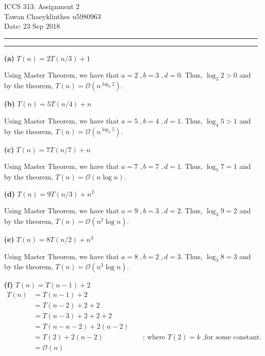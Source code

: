\documentclass[a4paper, 12pt]{article}
\newcommand{\question}[1] {\vspace{.25in} \hrule\vspace{0.5em}
	\noindent{\bf #1} \vspace{0.5em}
	\hrule \vspace{.10in}}
\renewcommand{\part}[1] {\vspace{.10in} {\bf (#1)}}
\begin{document}
	\medskip
	
	\thispagestyle{plain}
	\begin{center}
		{\Large ICCS 313: Assignment 2}\\
		Tawan Chaeyklinthes u5980963\\
		Date: 23 Sep 2018
	\end{center}

\question{Problem 1}

\part{a} $T(n) = 2T(n/3) + 1$

Using Master Theorem, we have that $a = 2\;, b=3\;, d=0$. Thus,
$\log_3 2 > 0$ and by the theorem, $T(n) = \mathcal{O}(n^{\log_3 2})$.

\part{b} $T(n) = 5T(n/4) + n$

Using Master Theorem, we have that $a = 5\;, b=4\;, d=1$. Thus,
$\log_4 5 > 1$ and by the theorem, $T(n) = \mathcal{O}(n^{\log_4 5})$.

\part{c} $T(n) = 7 T(n/7) + n$

Using Master Theorem, we have that $a = 7\;, b=7\;, d=1$. Thus,
$\log_7 7 = 1$ and by the theorem, $T(n) = \mathcal{O}(n\log n)$.

\part{d} $T(n) = 9T(n/3) + n^2 $

Using Master Theorem, we have that $a = 9\;, b=3\;, d=2$. Thus,
$\log_3 9 = 2$ and by the theorem, $T(n) = \mathcal{O}(n^2{\log n})$.

\part{e} $T(n) = 8T(n/2) + n^3$

Using Master Theorem, we have that $a = 8\;, b=2\;, d=3$. Thus,
$\log_3 8 = 3$ and by the theorem, $T(n) = \mathcal{O}(n^3{\log n})$.

\part{f} $T(n) = T(n-1) + 2$
\begin{align*}
	T(n) &= T(n-1) +2\\
	&= T(n-2) +2 +2\\
	&= T(n-3) +2 +2 +2\\
	&= T(n-n-2) + 2(n-2)\\
	&= T(2) + 2(n-2) && \text{ ; where } T(2) = k \text{ ,for some constant.}\\
	&= \mathcal{O}(n)
\end{align*}
\end{document}
